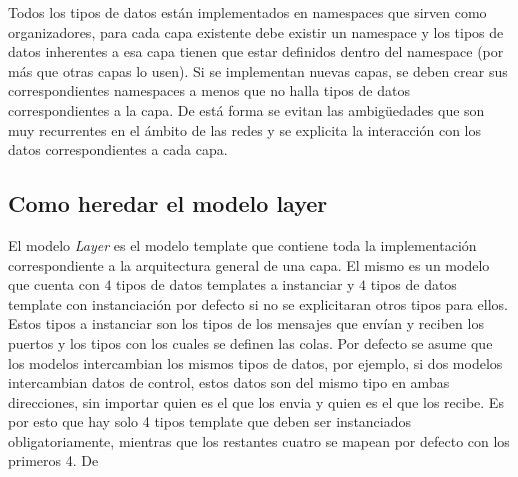 \documentclass[10pt,a4paper]{article}
\begin{document}
Todos los tipos de datos están implementados en namespaces que sirven como organizadores, para cada capa existente debe existir un namespace y los tipos de datos inherentes a esa capa tienen que estar definidos dentro del namespace (por más que otras capas lo usen). Si se implementan nuevas capas, se deben crear sus correspondientes namespaces a menos que no halla tipos de datos correspondientes a la capa. De está forma se evitan las ambigüedades que son muy recurrentes en el ámbito de las redes y se explicita la interacción con los datos correspondientes a cada capa.

\subsection{Como heredar el modelo layer}

El modelo \textit{Layer} es el modelo template que contiene toda la implementación correspondiente a la arquitectura general de una capa. El mismo es un modelo que cuenta con $4$ tipos de datos templates a instanciar y $4$ tipos de datos template con instanciación por defecto si no se explicitaran otros tipos para ellos. Estos tipos a instanciar son los tipos de los mensajes que envían y reciben los puertos y los tipos con los cuales se definen las colas. Por defecto se asume que los modelos intercambian los mismos tipos de datos, por ejemplo, si dos modelos intercambian datos de control, estos datos son del mismo tipo en ambas direcciones, sin importar quien es el que los envia y quien es el que los recibe. Es por esto que hay solo 4 tipos template que deben ser instanciados obligatoriamente, mientras que los restantes cuatro se mapean por defecto con los primeros 4. De\\
\end{document}
